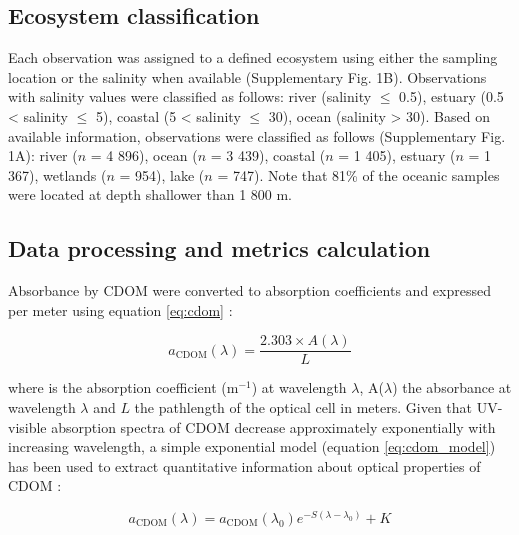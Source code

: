 \subsection*{Ecosystem classification}

Each observation was assigned to a defined ecosystem using either the sampling location or the salinity when available (Supplementary Fig. 1B). Observations with salinity values were classified as follows: river (salinity $\leq$ 0.5), estuary (0.5 < salinity $\leq$ 5), coastal (5 < salinity $\leq$ 30), ocean (salinity > 30). Based on available information, observations were classified as follows (Supplementary Fig. 1A): river ($n$ = 4 896), ocean ($n$ = 3 439), coastal ($n$ = 1 405), estuary ($n$ = 1 367), wetlands ($n$ = 954), lake ($n$ = 747). Note that 81\% of the oceanic samples were located at depth shallower than 1 800 m.

\subsection*{Data processing and metrics calculation}

Absorbance by CDOM were converted to absorption coefficients and expressed per meter using equation \ref{eq:cdom} \citep{Kirk1994}:

\begin{equation}
  a_{\text{CDOM}}(\lambda) = \frac{2.303 \times A(\lambda)}{L}
  \label{eq:cdom}
\end{equation}

where \acdom{\lambda} is the absorption coefficient (m$^{-1}$) at wavelength $\lambda$, A($\lambda$) the absorbance at wavelength $\lambda$ and $L$ the pathlength of the optical cell in meters. Given that UV-visible absorption spectra of CDOM decrease approximately exponentially with increasing wavelength, a simple exponential model (equation \ref{eq:cdom_model}) has been used to extract quantitative information about optical properties of CDOM \citep{Jerlov1968, Bricaud1981, Stedmon2001}:

\begin{equation}
  a_{\text{CDOM}}(\lambda) = a_{\text{CDOM}}(\lambda_0)e^{-S(\lambda - \lambda_0)} + K
  \label{eq:cdom_model}
\end{equation}

